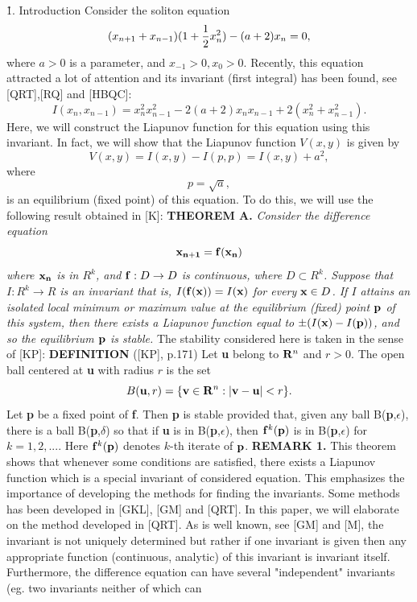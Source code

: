 {\r 1. Introduction}
\bigskip
Consider the soliton equation 
$$(x_{n+1} + x_{n-1})(1+{1\over 2}x_n^2) - (a+2)x_n=0,$$ 
where $a>0$ is a parameter, and $x_{-1}>0, x_0>0$. Recently, this equation 
attracted a lot of attention and its invariant (first integral) has been found,  
see [QRT],[RQ] and [HBQC]:
$$I(x_n,x_{n-1})= x_n^2 x_{n-1}^2 - 2(a+2)x_n x_{n-1} + 2(x_n^2 + x_{n-1}^2).$$ 
Here,  we will construct the Liapunov function for this equation using this  
invariant. 
In fact, we will show that the Liapunov function $V(x,y)$ is given by
$$V(x,y)=I(x,y)-I(p,p)=I(x,y)+a^2,$$
where 
$$p= \sqrt a,$$
is an equilibrium (fixed point) of this equation. To do this, we will use the 
following result obtained in [K]:
\bigskip
{\bf THEOREM A.} {\it Consider the  difference equation 
$${\bf x_{n+1}}={\bf f( x_n)}$$
where ${\bf x_n}$ is in $R^k$, and ${\bf f}: D\to D$ is continuous, where $D \subset R^k$. 
Suppose that $I:R^k\to R$ is an invariant that is, $I({\bf f(x)})=I({\bf x})$ 
for every ${\bf x}\in D$. If $I$ attains an isolated local minimum or maximum value 
at the  equilibrium (fixed) point ${\bf p}$  of this system, then there exists a 
Liapunov function equal to  $\pm(I({\bf x}) - I({\bf p}))$, and so the equilibrium 
${\bf p}$ is stable.} 
\bigskip
The stability considered here is taken in the sense of [KP]: 
\medskip
{\bf DEFINITION} ([KP], p.171) Let {\bf u} belong to ${\bf R}^n$ and $r>0$. The open
ball centered at {\bf u} with radius $r$ is the set
$$B({\bf u},r) = \{{\bf v} \in {\bf R}^n: |{\bf v} - {\bf u}|<r\}.$$
Let {\bf p} be a fixed point of {\bf f}. Then {\bf p} is stable provided that,
given any ball B({\bf p},$\epsilon$), there is a ball B({\bf p},$\delta$) so that
if {\bf u} is in B({\bf p},$\epsilon$), then ${\bf f}^k ({\bf p })$ is in B({\bf p},$\epsilon$)
for $k=1,2,...$. Here ${\bf f}^k ({\bf p })$ denotes $k$-th iterate of ${\bf p}$.
\medskip
{\bf REMARK 1.} This theorem shows that whenever some conditions are satisfied, 
there exists a Liapunov function which is a special invariant of considered equation. 
This emphasizes the importance of developing the methods for finding the invariants. 
Some methods has been developed in [GKL], [GM] and [QRT].  
In this paper, we will elaborate on the method developed in [QRT]. 
As is well known, see [GM] and [M], the invariant is not uniquely determined but 
rather if one invariant is given then any appropriate function (continuous, 
analytic) of this invariant is invariant itself. Furthermore, the difference equation can 
have several "independent" invariants (eg. two invariants neither of which can
